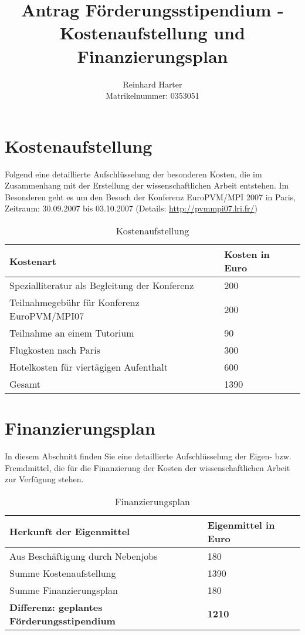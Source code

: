 \documentclass[a4paper,fleqn]{article}
\title{Antrag F\"orderungsstipendium - Kostenaufstellung und Finanzierungsplan}
\author{Reinhard Harter\\Matrikelnummer: 0353051\\ \email{h0353051@wu-wien.ac.at}}
\begin{document}
\maketitle

\section{Kostenaufstellung}

Folgend eine detaillierte Aufschl\"usselung der besonderen Kosten, die
im Zusammenhang mit der Erstellung der wissenschaftlichen Arbeit
entstehen. Im Besonderen geht es um den Besuch der Konferenz EuroPVM/MPI 2007 in Paris, Zeitraum: 30.09.2007 bis 03.10.2007 (Details: \url{http://pvmmpi07.lri.fr/})

\begin{table}[ht]
  \centering
  \caption{Kostenaufstellung}
  \label{table:Kostenaufstellung}
  \begin{tabular}{|l|l|}
    \hline
    Kostenart                              & Kosten in Euro \\
    \hline
    Spezialliteratur als Begleitung der Konferenz				  & 200  \\
    Teilnahmegeb\"uhr f\"ur Konferenz EuroPVM/MPI07 			& 200  \\
    Teilnahme an einem Tutorium                     			&  90  \\
    Flugkosten nach Paris                           			& 300  \\
    Hotelkosten f\"ur viert\"agigen Aufenthalt      			& 600  \\
    \hline
    Gesamt                                          &1390  \\  
    \hline
  \end{tabular}
\end{table}


\section{Finanzierungsplan}

In diesem Abschnitt finden Sie eine detaillierte Aufschl\"usselung der
Eigen- bzw. Fremdmittel, die f\"ur die Finanzierung der Kosten der
wissenschaftlichen Arbeit zur Verf\"ugung stehen.

\begin{table}[ht]
  \centering
  \caption{Finanzierungsplan}
  \label{table:Finanzierungsplan}
  \begin{tabular}{|l|l|}
    \hline
    Herkunft der Eigenmittel         & Eigenmittel in Euro \\
    \hline
    Aus Besch\"aftigung durch Nebenjobs             & 180  \\
    \hline
    \hline
    Summe Kostenaufstellung                         &1390  \\
    Summe Finanzierungsplan                         & 180  \\
    \hline
    \textbf{Differenz: geplantes F\"orderungsstipendium}&\textbf{1210}\\
    \hline
  \end{tabular}
\end{table}
\end{document}
